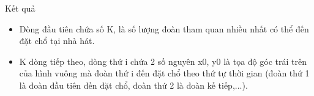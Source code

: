 Kết quả
\begin{itemize}
	\item     Dòng đầu tiên chứa số K, là số lượng đoàn tham quan nhiều nhất có thể đến đặt chổ tại nhà hát.   
	\item     K dòng tiếp theo, dòng thứ i chứa 2 số nguyên x0, y0 là tọa độ góc trái trên của hình vuông mà đoàn thứ i đến đặt chổ theo thứ tự thời gian (đoàn thứ 1 là đoàn đầu tiên đến đặt chổ, đoàn thứ 2 là đoàn kế tiếp,...).   
\end{itemize}
